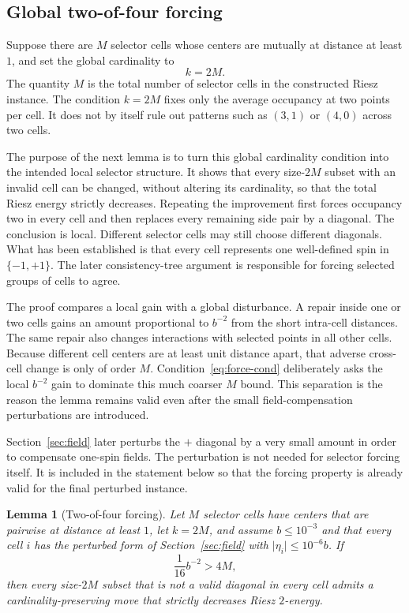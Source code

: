 \documentclass[12pt,a4paper]{article}
\newtheorem{lemma}[theorem]{Lemma}
\newcommand{\abs}[1]{\lvert #1\rvert}
\begin{document}
\subsection{Global two-of-four forcing}

Suppose there are $M$ selector cells whose centers are mutually at distance at least $1$, and set the global cardinality to
\begin{equation}\label{eq:k2M}
 k=2M.
\end{equation}
The quantity $M$ is the total number of selector cells in the constructed Riesz instance.  The condition $k=2M$ fixes only the average occupancy at two points per cell.  It does not by itself rule out patterns such as $(3,1)$ or $(4,0)$ across two cells.

The purpose of the next lemma is to turn this global cardinality condition into the intended local selector structure.  It shows that every size-$2M$ subset with an invalid cell can be changed, without altering its cardinality, so that the total Riesz energy strictly decreases.  Repeating the improvement first forces occupancy two in every cell and then replaces every remaining side pair by a diagonal.  The conclusion is local.  Different selector cells may still choose different diagonals.  What has been established is that every cell represents one well-defined spin in $\{-1,+1\}$.  The later consistency-tree argument is responsible for forcing selected groups of cells to agree.

The proof compares a local gain with a global disturbance.  A repair inside one or two cells gains an amount proportional to $b^{-2}$ from the short intra-cell distances.  The same repair also changes interactions with selected points in all other cells.  Because different cell centers are at least unit distance apart, that adverse cross-cell change is only of order $M$.  Condition~\eqref{eq:force-cond} deliberately asks the local $b^{-2}$ gain to dominate this much coarser $M$ bound.  This separation is the reason the lemma remains valid even after the small field-compensation perturbations are introduced.

Section~\ref{sec:field} later perturbs the $+$ diagonal by a very small amount in order to compensate one-spin fields.  The perturbation is not needed for selector forcing itself.  It is included in the statement below so that the forcing property is already valid for the final perturbed instance.

\begin{lemma}[Two-of-four forcing]\label{lem:selector-force}
Let $M$ selector cells have centers that are pairwise at distance at least $1$, let $k=2M$, and assume $b\le10^{-3}$ and that every cell $i$ has the perturbed form of Section~\ref{sec:field} with $\abs{\eta_i}\le10^{-6}b$.  If
\begin{equation}\label{eq:force-cond}
 \frac1{16}b^{-2}>4M,
\end{equation}
then every size-$2M$ subset that is not a valid diagonal in every cell admits a cardinality-preserving move that strictly decreases Riesz $2$-energy.
\end{lemma}
\end{document}
